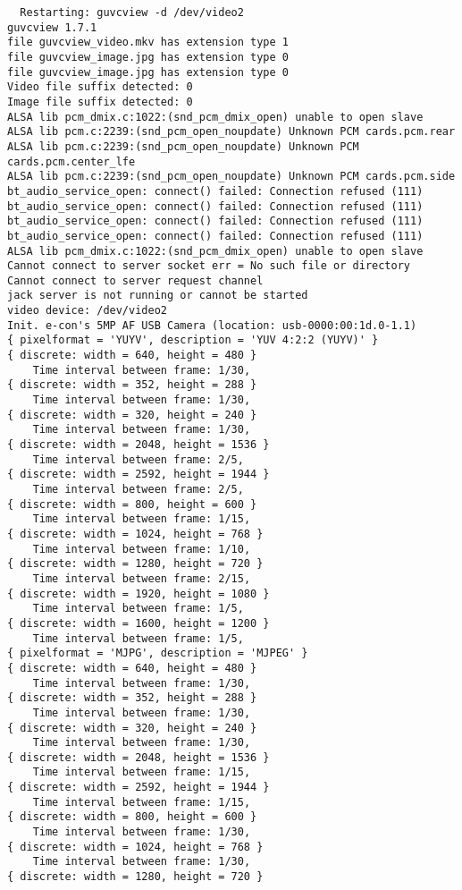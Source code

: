 \documentclass{article}
\begin{document}
\begin{lstlisting}
  Restarting: guvcview -d /dev/video2
guvcview 1.7.1
file guvcview_video.mkv has extension type 1
file guvcview_image.jpg has extension type 0
file guvcview_image.jpg has extension type 0
Video file suffix detected: 0
Image file suffix detected: 0
ALSA lib pcm_dmix.c:1022:(snd_pcm_dmix_open) unable to open slave
ALSA lib pcm.c:2239:(snd_pcm_open_noupdate) Unknown PCM cards.pcm.rear
ALSA lib pcm.c:2239:(snd_pcm_open_noupdate) Unknown PCM cards.pcm.center_lfe
ALSA lib pcm.c:2239:(snd_pcm_open_noupdate) Unknown PCM cards.pcm.side
bt_audio_service_open: connect() failed: Connection refused (111)
bt_audio_service_open: connect() failed: Connection refused (111)
bt_audio_service_open: connect() failed: Connection refused (111)
bt_audio_service_open: connect() failed: Connection refused (111)
ALSA lib pcm_dmix.c:1022:(snd_pcm_dmix_open) unable to open slave
Cannot connect to server socket err = No such file or directory
Cannot connect to server request channel
jack server is not running or cannot be started
video device: /dev/video2 
Init. e-con's 5MP AF USB Camera (location: usb-0000:00:1d.0-1.1)
{ pixelformat = 'YUYV', description = 'YUV 4:2:2 (YUYV)' }
{ discrete: width = 640, height = 480 }
	Time interval between frame: 1/30, 
{ discrete: width = 352, height = 288 }
	Time interval between frame: 1/30, 
{ discrete: width = 320, height = 240 }
	Time interval between frame: 1/30, 
{ discrete: width = 2048, height = 1536 }
	Time interval between frame: 2/5, 
{ discrete: width = 2592, height = 1944 }
	Time interval between frame: 2/5, 
{ discrete: width = 800, height = 600 }
	Time interval between frame: 1/15, 
{ discrete: width = 1024, height = 768 }
	Time interval between frame: 1/10, 
{ discrete: width = 1280, height = 720 }
	Time interval between frame: 2/15, 
{ discrete: width = 1920, height = 1080 }
	Time interval between frame: 1/5, 
{ discrete: width = 1600, height = 1200 }
	Time interval between frame: 1/5, 
{ pixelformat = 'MJPG', description = 'MJPEG' }
{ discrete: width = 640, height = 480 }
	Time interval between frame: 1/30, 
{ discrete: width = 352, height = 288 }
	Time interval between frame: 1/30, 
{ discrete: width = 320, height = 240 }
	Time interval between frame: 1/30, 
{ discrete: width = 2048, height = 1536 }
	Time interval between frame: 1/15, 
{ discrete: width = 2592, height = 1944 }
	Time interval between frame: 1/15, 
{ discrete: width = 800, height = 600 }
	Time interval between frame: 1/30, 
{ discrete: width = 1024, height = 768 }
	Time interval between frame: 1/30, 
{ discrete: width = 1280, height = 720 }

\end{lstlisting}
\end{document}
